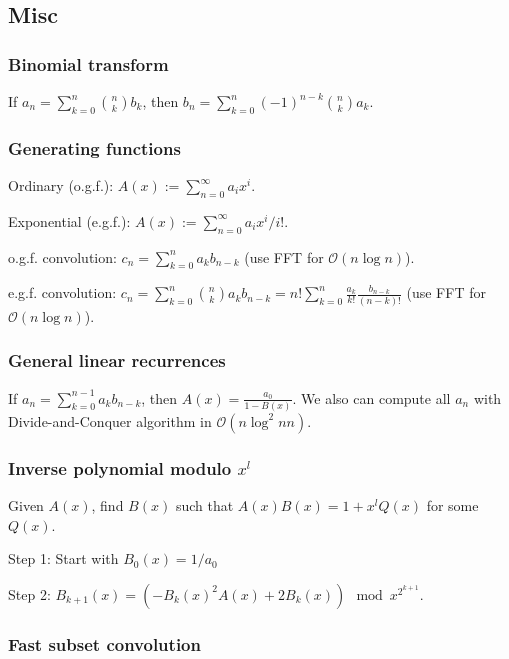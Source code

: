 \documentclass[8pt,a4paper,landscape,oneside]{amsart}
\begin{document}
\begin{multicols*}{3}
        \subsection{Misc}
            \subsubsection{Binomial transform}
                If $a_n = \sum_{k=0}^{n} \binom{n}{k} b_k$, then $b_n = \sum_{k=0}^{n} (-1)^{n-k} \binom{n}{k} a_k$.

            \subsubsection{Generating functions}

                Ordinary (o.g.f.): $A(x) := \sum_{n=0}^{\infty} a_i x^i$.

                Exponential (e.g.f.): $A(x) := \sum_{n=0}^{\infty} a_i x^i/i!$.

                o.g.f. convolution: $c_n = \sum_{k=0}^{n} a_k b_{n-k}$ (use FFT for $\mathcal{O}(n \log n)$).

                e.g.f. convolution: $c_n = \sum_{k=0}^{n} \binom{n}{k} a_k b_{n-k} = n! \sum_{k=0}^{n} \frac{a_k}{k!} \frac{b_{n-k}}{(n-k)!}$ (use FFT for $\mathcal{O}(n \log n)$).

            \subsubsection{General linear recurrences}
                
                If $a_n = \sum_{k=0}^{n-1} a_k b_{n-k}$, then $A(x) = \frac{a_0}{1-B(x)}$.
                We also can compute all $a_n$ with Divide-and-Conquer algorithm in $\mathcal{O}(n \log^2 n n)$.

            \subsubsection{Inverse polynomial modulo $x^l$}
                
                Given $A(x)$, find $B(x)$ such that $A(x)B(x) = 1 + x^l Q(x)$ for some $Q(x)$.

                Step 1: Start with $B_0(x) = 1/a_0$

                Step 2: $B_{k+1}(x) = (-B_k(x)^2 A(x) + 2 B_k(x)) \mod x^{2^{k+1}}$.

            \subsubsection{Fast subset convolution}
                

\end{multicols*}
\end{document}

